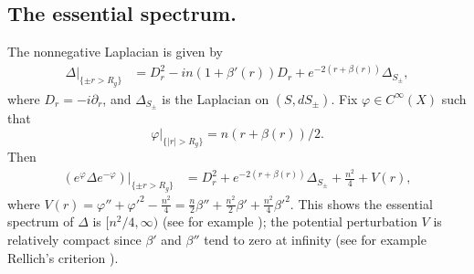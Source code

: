 \documentclass[reqno, 12pt]{amsart}
\newcommand \D {\partial}
\theoremstyle{definition}
\numberwithin{equation}{section}
\numberwithin{prop}{section}
\numberwithin{figure}{section}
\begin{document}
\subsection{The essential spectrum.}\label{spectrum}
The nonnegative Laplacian is given by
\begin{align*} \Delta|_{\{\pm r >R_g\}}  %
&= D_r^2 - i n(1 + \beta'(r))D_r + e^{-2(r + \beta(r))}  \Delta_{S_\pm}, \end{align*}
where $D_r = -i\D_r$, and $\Delta_{S_\pm}$ is the Laplacian on $(S,dS_{\pm})$. %
Fix $\varphi\in C^\infty(X)$ such that
\begin{equation}\label{e:phi} \varphi|_{\{|r|>R_g\}} = n(r + \beta(r))/2.\end{equation}
Then 
\begin{equation}\label{e:vdef}
\begin{split}
\left.\left(e^{\varphi} \Delta e^{-\varphi}\right)\right|_{\{\pm r>R_g\}}%
&= D_r^2 + e^{-2(r + \beta(r))} \Delta _{S_\pm} + \frac {n^2} 4 + V(r),
\end{split}
\end{equation}
where $V(r) = \varphi'' + {\varphi'}^2  - \frac{n^2}4  =   \frac n 2 \beta'' + \frac{n^2}2 \beta'  + \frac{n^2}4 {\beta'}^2 .$ This shows  the essential spectrum of $\Delta$ is $[n^2/4 ,\infty)$ %
(see for example \cite[Theorem XIII.14, Corollary 3]{rs}); the potential perturbation $V$ is relatively compact since $\beta'$ and $\beta''$ tend to zero at infinity (see for example Rellich's criterion \cite[Theorem XII.65]{rs}).
\end{document}
